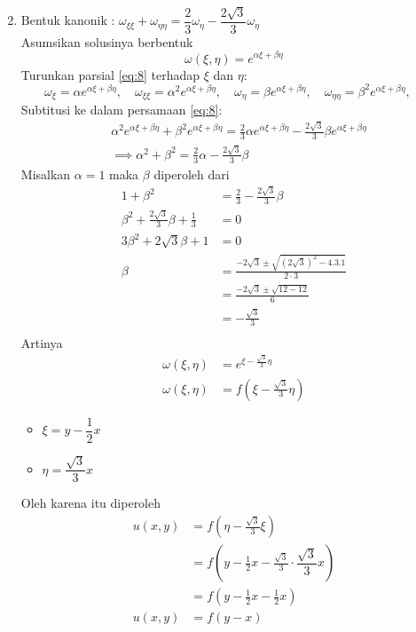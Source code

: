 \documentclass[a4paper]{article}
\theoremstyle{definition}
\begin{document}
\begin{enumerate}
\begin{equation*}
  \end{equation*}
  \item Bentuk kanonik : $\omega_{\xi\xi} + \omega_{\eta\eta} =  \dfrac{2}{3} \omega_{\eta}-\dfrac{2\sqrt{3}}{3} \omega_{\eta}$\\
  Asumsikan solusinya berbentuk
  \begin{equation}
      \omega(\xi,\eta) = e^{\alpha\xi+\beta\eta}\label{eq:8}
  \end{equation}
  Turunkan parsial \eqref{eq:8} terhadap $\xi$ dan $\eta$:
  \begin{equation*}
      \omega_\xi = \alpha e^{\alpha\xi+\beta\eta},\quad
      \omega_{\xi\xi} = \alpha^2 e^{\alpha\xi+\beta\eta},\quad
      \omega_{\eta} = \beta e^{\alpha\xi+\beta\eta},\quad
      \omega_{\eta\eta} = \beta^2 e^{\alpha\xi+\beta\eta},\quad
  \end{equation*}
  Subtitusi ke dalam persamaan \eqref{eq:8}:
  \begin{align*}
      &\alpha^2 e^{\alpha\xi+\beta\eta} + \beta^2 e^{\alpha\xi+\beta\eta} = \frac{2}{3}\alpha e^{\alpha\xi+\beta\eta}-\frac{2\sqrt{3}}{3}\beta e^{\alpha\xi+\beta\eta}\\
      &\implies \alpha^2 + \beta^2 = \frac{2}{3}\alpha-\frac{2\sqrt{3}}{3}\beta
  \end{align*}
  Misalkan $\alpha =  1$ maka $\beta$ diperoleh dari
  \begin{align*}
      1 + \beta^2 &= \frac{2}{3}-\frac{2\sqrt{3}}{3}\beta\\
      \beta^2 + \frac{2\sqrt{3}}{3}\beta + \frac{1}{3} &= 0\\
      3\beta^2 + 2\sqrt{3}\beta + 1 &= 0\\
      \beta &= \frac{-2\sqrt{3}\pm\sqrt{(2\sqrt{3})^2-4.3.1}}{2\cdot 3}\\
      &= \frac{-2\sqrt{3}\pm\sqrt{12-12}}{6}\\
      &= -\frac{\sqrt{3}}{3}\\
  \end{align*}
  Artinya
  \begin{align*}
      \omega(\xi,\eta) &= e^{\xi-\frac{\sqrt{3}}{3}\eta}\\
      \omega(\xi,\eta) &= f(\xi-\frac{\sqrt{3}}{3}\eta)
  \end{align*}
  \begin{itemize}
    \item $\xi = y-\dfrac{1}{2}x$
    \item $\eta = \dfrac{\sqrt{3}}{3}x$
  \end{itemize}
  Oleh karena itu diperoleh
  \begin{align*}
    u(x,y) &= f(\eta-\frac{\sqrt{3}}{3}\xi)\\
    &= f\left(y-\frac{1}{2}x-\frac{\sqrt{3}}{3}\cdot \dfrac{\sqrt{3}}{3}x\right)\\
    &= f\left(y-\frac{1}{2}x-\frac{1}{2}x\right)\\
    u(x,y)&= f\left(y-x\right)
  \end{align*}
\end{enumerate}
\end{document}

